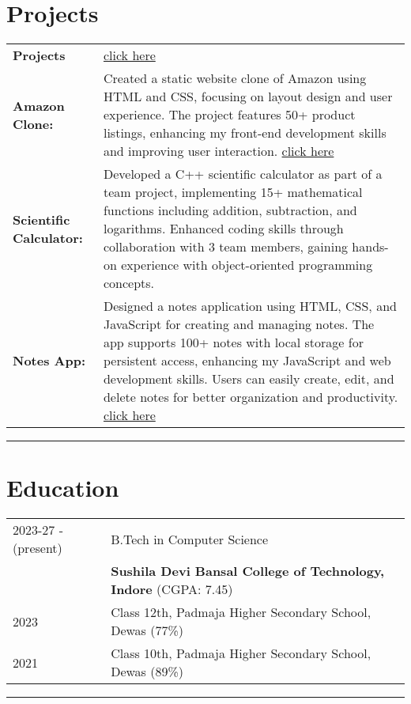 \documentclass[a4paper,12pt]{article}
\begin{document}
\section{Projects}
\begin{tabularx}{\linewidth}{ @{}l X@{} }
\textbf{Projects} & \hfill \href{https://github.com/deepakagrawal3103}{click here} \\[3.75pt]

\textbf{Amazon Clone:} & Created a static website clone of Amazon using HTML and CSS, focusing on layout design and user experience. The project features 50+ product listings, enhancing my front-end development skills and improving user interaction. \href{https://deepakagrawal3103.github.io/amazonclone/}{click here} \\[3pt]

\textbf{Scientific Calculator:} & Developed a C++ scientific calculator as part of a team project, implementing 15+ mathematical functions including addition, subtraction, and logarithms. Enhanced coding skills through collaboration with 3 team members, gaining hands-on experience with object-oriented programming concepts. \\[3pt]

\textbf{Notes App:} & Designed a notes application using HTML, CSS, and JavaScript for creating and managing notes. The app supports 100+ notes with local storage for persistent access, enhancing my JavaScript and web development skills. Users can easily create, edit, and delete notes for better organization and productivity. \href{https://deepakagrawal3103.github.io/Notes-App/}{click here} \\

\end{tabularx}
\noindent\rule{\linewidth}{0.5pt} %

\section{Education}
\begin{tabularx}{\linewidth}{@{}l X@{}}
2023-27 - (present) & B.Tech in Computer Science \\ 
                  & \textbf{Sushila Devi Bansal College of Technology, Indore} \hfill \normalsize (CGPA: 7.45) \\

2023 & Class 12th, Padmaja Higher Secondary School, Dewas \hfill (77\%) \\ 

2021 & Class 10th, Padmaja Higher Secondary School, Dewas \hfill (89\%) \\ 
\end{tabularx} 
\noindent\rule{\linewidth}{0.5pt} %
\end{document}
